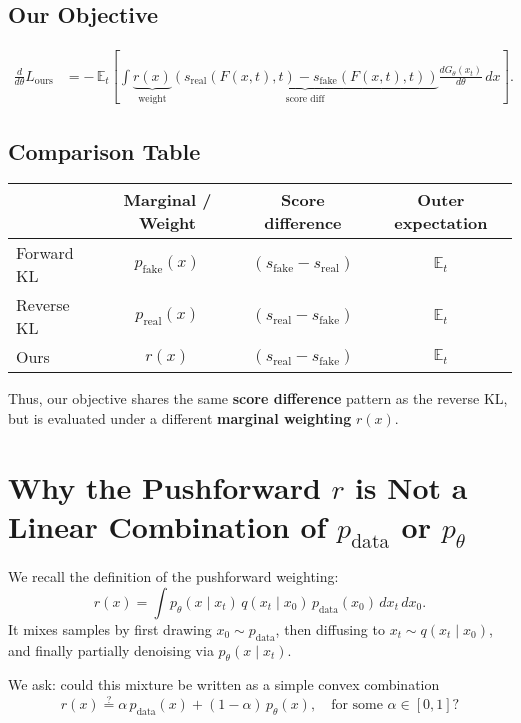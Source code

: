 \documentclass{article}
\begin{document}
\subsection*{Our Objective}
\begin{align*}
\frac{d}{d\theta} L_{\mathrm{ours}}
&= 
-\,\mathbb{E}_{t}\!\left[
  \int 
  \underbrace{r(x)}_{\text{weight}}
  \underbrace{(s_{\mathrm{real}}(F(x,t),t) - s_{\mathrm{fake}}(F(x,t),t))}_{\text{score diff}}
  \frac{dG_\theta(x_t)}{d\theta}\,dx
\right].
\end{align*}

\subsection*{Comparison Table}
\begin{center}
\begin{tabular}{lccc}
\hline
 & Marginal / Weight & Score difference & Outer expectation \\ \hline
Forward KL & $p_{\mathrm{fake}}(x)$ & $(s_{\mathrm{fake}} - s_{\mathrm{real}})$ & $\mathbb{E}_{t}$ \\
Reverse KL & $p_{\mathrm{real}}(x)$ & $(s_{\mathrm{real}} - s_{\mathrm{fake}})$ & $\mathbb{E}_{t}$ \\
Ours & $r(x)$ & $(s_{\mathrm{real}} - s_{\mathrm{fake}})$ & $\mathbb{E}_{t}$ \\ \hline
\end{tabular}
\end{center}

\noindent
Thus, our objective shares the same \textbf{score difference} pattern as the reverse KL,
but is evaluated under a different \textbf{marginal weighting} $r(x)$.






\section{Why the Pushforward $r$ is Not a Linear Combination of $p_{\text{data}}$ or $p_\theta$}

We recall the definition of the pushforward weighting:
\[
r(x)
  = \int p_\theta(x \mid x_t)\, q(x_t \mid x_0)\, p_{\text{data}}(x_0)\, dx_t\, dx_0.
\]
It mixes samples by first drawing $x_0 \sim p_{\text{data}}$, then diffusing to $x_t \sim q(x_t \mid x_0)$,
and finally partially denoising via $p_\theta(x \mid x_t)$.

We ask: could this mixture be written as a simple convex combination
\[
r(x) \stackrel{?}{=} \alpha\,p_{\text{data}}(x) + (1-\alpha)\,p_\theta(x),
\quad \text{for some } \alpha \in [0,1]?
\]
\end{document}
